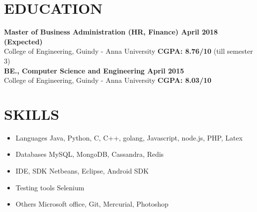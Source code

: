 \documentclass[11pt,a4paper]{article}
\begin{document}
\section*{EDUCATION}
\textbf{Master of Business Administration (HR, Finance) {\hfill April 2018 (Expected)}}\\
College of Engineering, Guindy - Anna University {\hfill \textbf{CGPA: 8.76/10} (till semester 3)}\\
\textbf{BE., Computer Science and Engineering {\hfill April 2015}}\\
College of Engineering, Guindy - Anna University {\hfill \textbf{CGPA: 8.03/10}}\\
\section*{SKILLS}
\TabPositions{3cm}
\begin{itemize}[noitemsep]
\item Languages \tab Java, Python, C, C++, golang, Javascript, node.js, PHP, Latex
\item Databases \tab MySQL, MongoDB, Cassandra, Redis
\item IDE, SDK \tab Netbeans, Eclipse, Android SDK
\item Testing tools \tab Selenium
\item Others \tab Microsoft office, Git, Mercurial, Photoshop
\end{itemize}
\newpage
\end{document}
